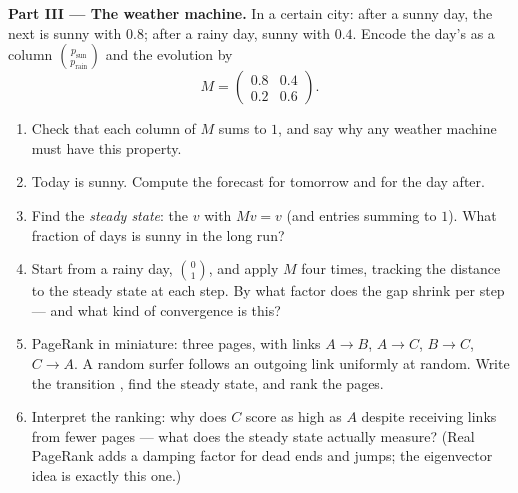 \begin{problem}
\medskip
\noindent\textbf{Part III --- The weather machine.}
In a certain city: after a sunny day, the next is sunny with
 $0.8$; after a rainy day, sunny with 
$0.4$. Encode the day's  as a column
$\binom{p_{\text{sun}}}{p_{\text{rain}}}$ and the evolution by
\[
M = \begin{pmatrix} 0.8 & 0.4\\ 0.2 & 0.6 \end{pmatrix}.
\]
\begin{enumerate}[resume]
  \item Check that each column of $M$ sums to $1$, and say why
        any weather machine must have this property.
  \item Today is sunny. Compute the forecast for tomorrow and
        for the day after.
  \item Find the \emph{steady state}: the  $v$ with
        $Mv = v$ (and entries summing to $1$). What fraction of
        days is sunny in the long run?
  \item Start from a rainy day, $\binom01$, and apply $M$ four
        times, tracking the distance to the steady state at
        each step. By what factor does the gap shrink per step
        --- and what kind of convergence is this?
  \item PageRank in miniature: three pages, with links
        $A \to B$, $A \to C$, $B \to C$, $C \to A$. A random
        surfer follows an outgoing link uniformly at random.
        Write the transition , find the steady state, and
        rank the pages.
  \item Interpret the ranking: why does $C$ score as high as
        $A$ despite receiving links from fewer pages --- what
        does the steady state actually measure? (Real PageRank
        adds a damping factor for dead ends and jumps; the
        eigenvector idea is exactly this one.)
\end{enumerate}


\end{problem}
